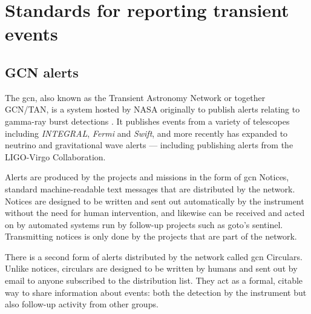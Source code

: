 
\newpage
\section{Standards for reporting transient events}
\label{sec:alert_standards}
\begin{colsection}


\begin{colsection}


\end{colsection}


\subsection{GCN alerts}
\label{sec:gcn}
\begin{colsection}

The \gls{gcn}, also known as the Transient Astronomy Network or together GCN/TAN, is a system hosted by NASA originally to publish alerts relating to gamma-ray burst detections \citep{GCN}. It publishes events from a variety of telescopes including \textit{INTEGRAL}, \textit{Fermi} and \textit{Swift}, and more recently has expanded to neutrino and gravitational wave alerts --- including publishing alerts from the LIGO-Virgo Collaboration.

Alerts are produced by the projects and missions in the form of \gls{gcn} Notices, standard machine-readable text messages that are distributed by the network. Notices are designed to be written and sent out automatically by the instrument without the need for human intervention, and likewise can be received and acted on by automated systems run by follow-up projects such as \gls{goto}'s sentinel. Transmitting notices is only done by the projects that are part of the network.

There is a second form of alerts distributed by the network called \gls{gcn} Circulars. Unlike notices, circulars are designed to be written by humans and sent out by email to anyone subscribed to the distribution list. They act as a formal, citable way to share information about events: both the detection by the instrument but also follow-up activity from other groups.

\end{colsection}


\end{colsection}
